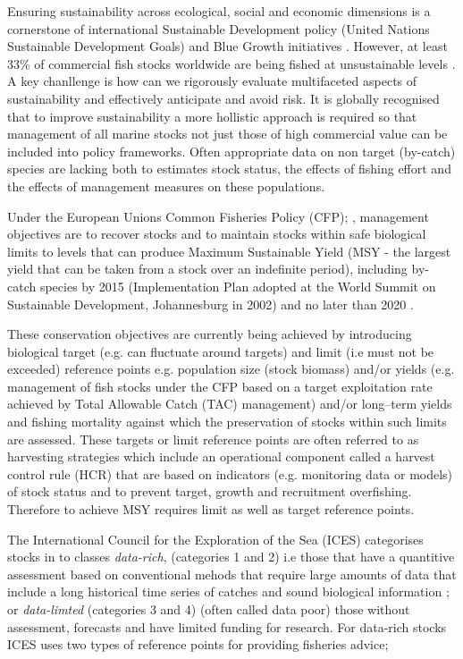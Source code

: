 \documentclass[preprint,review,12pt]{elsarticle}
\begin{document}
Ensuring sustainability across ecological, social and economic dimensions is a cornerstone of international Sustainable Development policy (United Nations Sustainable Development Goals) and Blue Growth initiatives \cite{burgess2016five}.  However, at least 33\% of commercial fish stocks worldwide are being fished at unsustainable levels \cite{food2018state}.  A key chanllenge is how can we rigorously evaluate multifaceted aspects of sustainability and effectively anticipate and avoid risk. It is globally recognised that to improve sustainability a more hollistic approach is required so that management of all marine stocks not just those of high commercial value can be included into policy frameworks. Often appropriate data on non target (by-catch) species are lacking \cite{doi:10.1016/j.icesjms.2006.03.028} both to estimates stock status, the effects of fishing effort and the effects of management measures on these populations.

Under the European Unions Common Fisheries Policy (CFP); \cite{european2013regulation}, management objectives are to recover stocks and to maintain stocks within safe biological limits to levels that can produce Maximum Sustainable Yield (MSY - the largest yield that can be taken from a stock over an indefinite period), including by-catch species by 2015 (Implementation Plan adopted at the World Summit on Sustainable Development, Johannesburg in 2002) and no later than 2020 \cite{summit2002world} \cite{fao2003world}.  

These conservation objectives are currently being achieved by introducing biological target (e.g. can fluctuate around targets) and limit (i.e must not be exceeded) reference points e.g. population size (stock biomass) and/or yields (e.g. management of fish stocks under the CFP based on a target exploitation rate achieved by Total Allowable Catch (TAC) management) and/or long–term yields and fishing mortality against which the preservation of stocks within such limits are assessed. These targets or limit reference points are often referred to as harvesting strategies which include an operational component called a harvest control rule (HCR) that are based on indicators (e.g. monitoring data or models) of stock status and to prevent target, growth and recruitment overfishing. Therefore to achieve MSY requires limit as well as target reference points.

The International Council for the Exploration of the Sea (ICES) categorises stocks in to classes \emph{data-rich}, (categories 1 and 2) i.e those that have a quantitive assessment based on conventional mehods that require large amounts of data that include a long historical time series of catches and sound biological information \cite{bentley2015data}; or \emph{data-limted} \cite{costello2012status}(categories 3 and 4) (often called data poor) those without assessment, forecasts and have limited funding for research. For data-rich stocks ICES uses two types of reference points for providing fisheries advice; 
\end{document}
